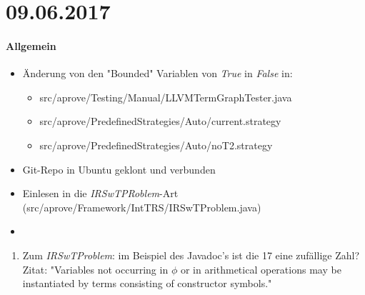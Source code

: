 \section*{09.06.2017}

\paragraph{Allgemein}
\begin{itemize}
	\item Änderung von den "Bounded" Variablen von \emph{True} in \emph{False}  in: 
		\begin{itemize}
			\item src/aprove/Testing/Manual/LLVMTermGraphTester.java
			\item src/aprove/PredefinedStrategies/Auto/current.strategy
			\item src/aprove/PredefinedStrategies/Auto/noT2.strategy
		\end{itemize}
	\item Git-Repo in Ubuntu geklont und verbunden
	\item Einlesen in die \emph{IRSwTPRoblem}-Art (src/aprove/Framework/IntTRS/IRSwTProblem.java)
	\item 
\end{itemize}

\begin{enumerate}
	\item Zum \emph{IRSwTProblem}: im Beispiel des Javadoc's ist die 17 eine zufällige Zahl? \newline
	Zitat: "Variables not occurring in $\phi$ or in arithmetical operations may be instantiated by terms consisting of constructor symbols."
\end{enumerate}